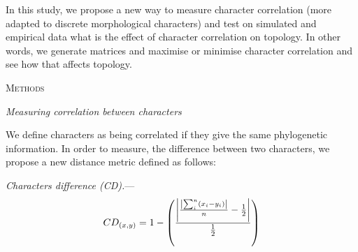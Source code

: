 \documentclass[12pt,letterpaper]{article}
\DeclarePairedDelimiter\abs{\lvert}{\rvert}%
\renewcommand{\section}[1]{%
\bigskip
\begin{center}
\begin{Large}
\normalfont\scshape #1
\medskip
\end{Large}
\end{center}}
\renewcommand{\subsection}[1]{%
\bigskip
\begin{center}
\begin{large}
\normalfont\itshape #1
\end{large}
\end{center}}
\renewcommand{\subsubsection}[1]{%
\vspace{2ex}
\noindent
\textit{#1.}---}
\begin{document}

In this study, we propose a new way to measure character correlation (more adapted to discrete morphological characters) and test on simulated and empirical data what is the effect of character correlation on topology. %
In other words, we generate matrices and maximise or minimise character correlation and see how that affects topology.


\section{Methods}

\subsection{Measuring correlation between characters}

We define characters as being correlated if they give the same phylogenetic information.
In order to measure, the difference between two characters, we propose a new distance metric defined as follows:

\subsubsection{Characters difference (CD)}
\begin{equation}
    CD_{(x,y)} = 1 - \left(\frac{\abs*{\frac{\abs*{\sum_{i}^{n}(x_{i} - y_{i})}}{n}-\frac{1}{2}}}{\frac{1}{2}}\right)
\end{equation}
\end{document}
